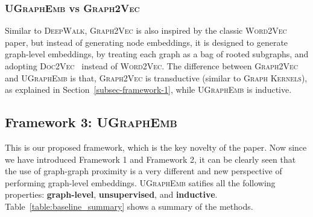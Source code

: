 \documentclass{article}
\newcommand{\model}{\textsc{UGraphEmb}\xspace}
\newcommand{\gk}{\textsc{Graph Kernels}\xspace}
\newcommand{\gv}{\textsc{Graph2Vec}\xspace}
\newcommand{\wv}{\textsc{Word2Vec}\xspace}
\begin{document}
\subsubsection{\model vs \gv}

Similar to \textsc{DeepWalk}, \gv is also inspired by the classic \wv paper, but instead of generating node embeddings, it is designed to generate graph-level embeddings, by treating each graph as a bag of rooted subgraphs, and adopting \textsc{Doc2Vec}~\cite{mikolov2013distributed} instead of \wv. The difference between \gv and \model is that, \gv is transductive (similar to \gk), as explained in Section~\ref{subsec-framework-1}, while \model is inductive. 

\subsection{Framework 3: \model}

This is our proposed framework, which is the key novelty of the paper. Now since we have introduced Framework 1 and Framework 2, it can be clearly seen that the use of graph-graph proximity is a very different and new perspective of performing graph-level embeddings. \model satifies all the following properties: {\textbf{graph-level}}, {\textbf{unsupervised}}, and {\textbf{inductive}}. Table~\ref{table:baseline_summary} shows a summary of the methods.
\end{document}
